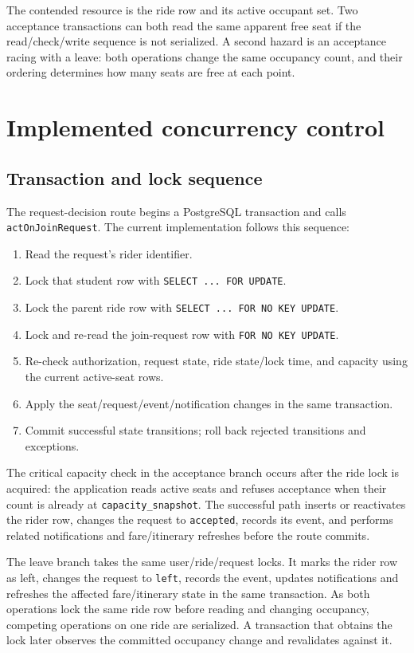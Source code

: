 \documentclass[11pt,a4paper]{article}
\begin{document}
The contended resource is the ride row and its active occupant set. Two acceptance transactions can
both read the same apparent free seat if the read/check/write sequence is not serialized. A
second hazard is an acceptance racing with a leave: both operations change the same occupancy
count, and their ordering determines how many seats are free at each point.

\section{Implemented concurrency control}

\subsection{Transaction and lock sequence}

The request-decision route begins a PostgreSQL transaction and calls
\texttt{actOnJoinRequest}. The current implementation follows this sequence:

\begin{enumerate}
  \item Read the request's rider identifier.
  \item Lock that student row with \texttt{SELECT ... FOR UPDATE}.
  \item Lock the parent ride row with \texttt{SELECT ... FOR NO KEY UPDATE}.
  \item Lock and re-read the join-request row with \texttt{FOR NO KEY UPDATE}.
  \item Re-check authorization, request state, ride state/lock time, and capacity using the
        current active-seat rows.
  \item Apply the seat/request/event/notification changes in the same transaction.
  \item Commit successful state transitions; roll back rejected transitions and exceptions.
\end{enumerate}

The critical capacity check in the acceptance branch occurs after the ride lock is acquired:
the application reads active seats and refuses acceptance when their count is already at
\texttt{capacity\_snapshot}. The successful path inserts or reactivates the rider row, changes
the request to \texttt{accepted}, records its event, and performs related notifications and
fare/itinerary refreshes before the route commits.

The leave branch takes the same user/ride/request locks. It marks the rider row as left, changes
the request to \texttt{left}, records the event, updates notifications and refreshes the affected
fare/itinerary state in the same transaction. As both operations lock the same ride row before
reading and changing occupancy, competing operations on one ride are serialized. A transaction
that obtains the lock later observes the committed occupancy change and revalidates against it.
\end{document}
